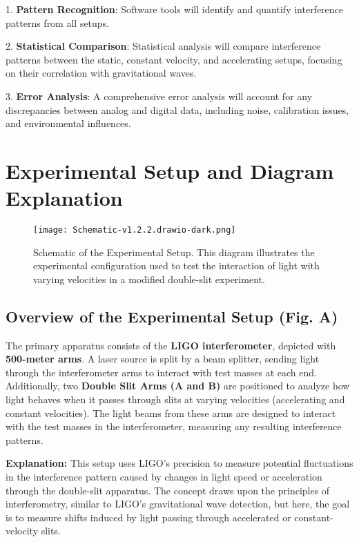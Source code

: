 \documentclass{article}
\begin{document}
1. \textbf{Pattern Recognition}: Software tools will identify and quantify interference patterns from all setups.
   
2. \textbf{Statistical Comparison}: Statistical analysis will compare interference patterns between the static, constant velocity, and accelerating setups, focusing on their correlation with gravitational waves.
   
3. \textbf{Error Analysis}: A comprehensive error analysis will account for any discrepancies between analog and digital data, including noise, calibration issues, and environmental influences.

\section{Experimental Setup and Diagram Explanation}

\begin{figure}[h]
    \centering
    \texttt{[image: Schematic-v1.2.2.drawio-dark.png]} %
    \caption{Schematic of the Experimental Setup. This diagram illustrates the experimental configuration used to test the interaction of light with varying velocities in a modified double-slit experiment.}
    \label{fig:experiment_setup}
\end{figure}
\subsection{Overview of the Experimental Setup (Fig. A)}

The primary apparatus consists of the \textbf{LIGO interferometer}, depicted with \textbf{500-meter arms}. A laser source is split by a beam splitter, sending light through the interferometer arms to interact with test masses at each end. Additionally, two \textbf{Double Slit Arms (A and B)} are positioned to analyze how light behaves when it passes through slits at varying velocities (accelerating and constant velocities). The light beams from these arms are designed to interact with the test masses in the interferometer, measuring any resulting interference patterns.

\textbf{Explanation:} This setup uses LIGO's precision to measure potential fluctuations in the interference pattern caused by changes in light speed or acceleration through the double-slit apparatus. The concept draws upon the principles of interferometry, similar to LIGO's gravitational wave detection, but here, the goal is to measure shifts induced by light passing through accelerated or constant-velocity slits.
\end{document}

